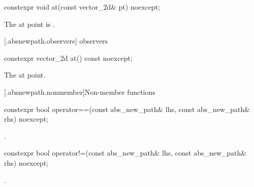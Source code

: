 %
\begin{itemdecl}
constexpr void at(const vector_2d& pt) noexcept;
\end{itemdecl}
\begin{itemdescr}
\pnum
\effects
The at point is .
\end{itemdescr}

 [\iotwod.absnewpath.observers]{ observers}%

%
\begin{itemdecl}
constexpr vector_2d at() const noexcept;
\end{itemdecl}
\begin{itemdescr}
\pnum
\returns
The at point.
\end{itemdescr}

 [\iotwod.absnewpath.nonmember]{Non-member functions}%

%
\begin{itemdecl}
constexpr bool operator==(const abs_new_path& lhs, const abs_new_path& rhs) 
  noexcept;
\end{itemdecl}
\begin{itemdescr}
\pnum
\returns
{}.
\end{itemdescr}

%
\begin{itemdecl}
constexpr bool operator!=(const abs_new_path& lhs, const abs_new_path& rhs) 
  noexcept;
\end{itemdecl}
\begin{itemdescr}
\pnum
\returns
{}.
\end{itemdescr}
